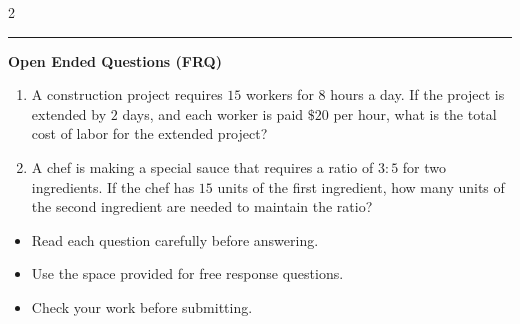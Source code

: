\documentclass[10pt]{article}
\begin{document}
\begin{multicols}{2}
\begin{enumerate}[label=\textbf{Q\arabic*.}, leftmargin=*, itemsep=6pt, parsep=0pt]
\end{enumerate}
\end{multicols}

\vspace{-0.2cm}
\hrule
\vspace{0.2cm}
\textbf{\small Open Ended Questions (FRQ)}
\begin{enumerate}[label=\textbf{Q\arabic*.}, start=9, itemsep=5pt, topsep=0pt]

  \item \small A construction project requires $15$ workers for $8$ hours a day. If the project is extended by $2$ days, and each worker is paid $\$20$ per hour, what is the total cost of labor for the extended project? \vspace{2cm}

  \item \small A chef is making a special sauce that requires a ratio of $3:5$ for two ingredients. If the chef has $15$ units of the first ingredient, how many units of the second ingredient are needed to maintain the ratio? \vspace{2cm}

\end{enumerate}

\vfill

\begin{tcolorbox}[colback=blue!5, colframe=mainblue!50, title=\small \textbf{Chef's Tips}, fonttitle=\bfseries, bottom=1mm]
\begin{itemize}[noitemsep, topsep=2pt, leftmargin=0.5cm]
  \item \scriptsize Read each question carefully before answering.\item \scriptsize Use the space provided for free response questions.\item \scriptsize Check your work before submitting.
\end{itemize}
\end{tcolorbox}
\end{document}
